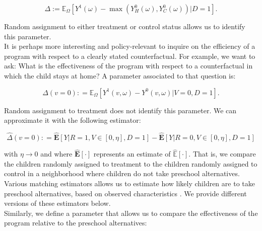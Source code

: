 \begin{equation}
\Delta := \mathbb{E}_{\Omega} \left[ Y^1 \left( \omega \right) -  \max \left(  Y_{H}^0 \left( \omega \right) ,  Y_{C}^0 \left( \omega \right)  \right) | D =1 \right]. \label{eq:mainest}
\end{equation}

\noindent Random assignment to either treatment or control status allows us to identify this parameter.\\ 

\noindent It is perhaps more interesting and policy-relevant to inquire on the efficiency of a program with respect to a clearly stated counterfactual. For example, we want to ask: What is the effectiveness of the program with respect to a counterfactual in which the child stays at home? A parameter associated to that question is: 

\begin{equation}
\Delta \left( v = 0 \right) : =   \mathbb{E}_{\Omega} \left[ Y^1 \left( v, \omega \right) - Y^0 \left( v, \omega \right) | V = 0, D = 1 \right]. \label{eq:par0}
\end{equation}

\noindent Random assignment to treatment does not identify this parameter. We can approximate it with the following estimator: 

\begin{equation}
\widehat{\Delta} \left( v = 0 \right) : = \widehat{\mathbf{E}} \left[ Y | R = 1, V \in \left[ 0 , \eta \right], D = 1 \right] - \widehat{\mathbf{E}} \left[ Y | R = 0, V \in \left[ 0 , \eta \right], D = 1 \right] \label{eq:estimates0}
\end{equation}

\noindent with $\eta \rightarrow 0$ and where $\widehat{\mathbf{E}}[\cdot]$ represents an estimate of $\widehat{\mathbb{E}}[\cdot]$. That is, we compare the children randomly assigned to treatment to the children randomly assigned to control in a neighborhood where children do not take preschool alternatives. Various matching estimators allows us to estimate how likely children are to take preschool alternatives, based on observed characteristics \citep{Heckman_Ichimura_etal_1997_REStud,Heckman_Ichimura_etal_1998_REStud}. We provide different versions of these estimators below.\\

\noindent Similarly, we define a parameter that allows us to compare the effectiveness of the program relative to the preschool alternatives: 

